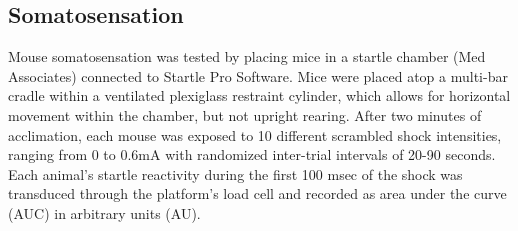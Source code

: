 \subsection{Somatosensation}
Mouse somatosensation was tested by placing mice in a startle
chamber (Med Associates) connected to Startle Pro Software. Mice were placed
atop a multi-bar cradle within a ventilated plexiglass restraint cylinder, which
allows for horizontal movement within the chamber, but not upright rearing.
After two minutes of acclimation, each mouse was exposed to 10 different
scrambled shock intensities, ranging from 0 to 0.6mA with randomized inter-trial
intervals of 20-90 seconds. Each animal’s startle reactivity during the first
100 msec of the shock was transduced through the platform’s load cell and
recorded as area under the curve (AUC) in arbitrary units (AU). 
